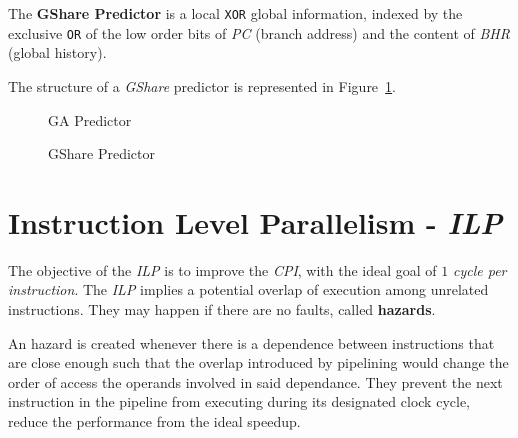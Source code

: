 \documentclass[english]{article}
\begin{document}
The \textbf{GShare Predictor} is a local \texttt{XOR} global information, indexed by the exclusive \texttt{OR} of the low order bits of \textit{PC} (branch address) and the content of \textit{BHR} (global history).

The structure of a \textit{GShare} predictor is represented in Figure~\ref{fig:GShare-predictor}.

\begin{figure}[htbp]
  \bigskip
  \centering
  \begin{minipage}[b]{0.6\textwidth}
    \centering
    \caption{GA Predictor}
    \label{fig:GA-predictor}
  \end{minipage}
  \begin{minipage}[b]{0.39\textwidth}
    \centering
    \caption{GShare Predictor}
    \label{fig:GShare-predictor}
  \end{minipage}
  \bigskip
\end{figure}

\newpage

\section{Instruction Level Parallelism - \textit{ILP}}

The objective of the \textit{ILP} is to improve the \textit{CPI}, with the ideal goal of \(1\) \textit{cycle per instruction}.
The \textit{ILP} implies a potential overlap of execution among unrelated instructions.
They may happen if there are no faults, called \textbf{hazards}.

An hazard is created whenever there is a dependence between instructions that are close enough such that the overlap introduced by pipelining would change the order of access the operands involved in said dependance.
They prevent the next instruction in the pipeline from executing during its designated clock cycle, reduce the performance from the ideal speedup.
\end{document}

